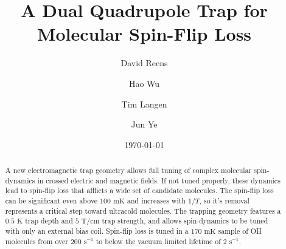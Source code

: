 \documentclass[%
 reprint,
groupedaddress,
 amsmath,amssymb,
 aps,
prl,
]{revtex4-1}
\begin{document}




\title{A Dual Quadrupole Trap for Molecular Spin-Flip Loss}%

\author{David Reens}
%
\author{Hao Wu}
\author{Tim Langen}%
\author{Jun Ye}
%

\date{\today}%


\begin{abstract}
A new electromagnetic trap geometry allows full tuning of complex molecular spin-dynamics in crossed electric and magnetic fields. If not tuned properly, these dynamics lead to spin-flip loss that afflicts a wide set of candidate molecules. The spin-flip loss can be significant even above $100\text{ mK}$ and increases with $1/T$, so it's removal represents a critical step toward ultracold molecules. The trapping geometry features a $0.5 \text{ K}$ trap depth and $5 \text{ T/cm}$ trap strength, and allows spin-dynamics to be tuned with only an external bias coil. Spin-flip loss is tuned in a $170 \text{ mK}$ sample of OH molecules from over $200 \text{ s}^{-1} $ to below the vacuum limited lifetime of $2 \text{ s}^{-1}$.
\end{abstract}


\maketitle
\end{document}
